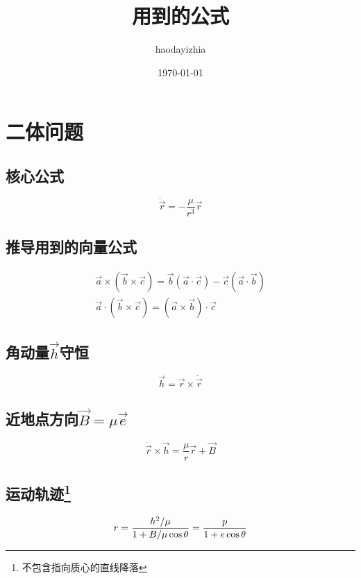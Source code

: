 \documentclass[UTF8]{ctexart}
\title{用到的公式}
\author{haodayizhia}
\date{\today}
\begin{document}
\renewcommand\theequation{%
\thesection.\arabic{equation}}

\maketitle
\tableofcontents
\section{二体问题}

\subsection{核心公式}
\begin{equation}
	\ddot{\vec{r}}=-\frac{\mu}{r^3}\vec{r}
\end{equation}

\subsection{推导用到的向量公式}

\begin{gather}
\vec{a}\times(\vec{b}\times\vec c) =\vec{b}(\vec{a}\cdot\vec{c})-\vec{c}(\vec{a}\cdot\vec{b})\\
\vec{a}\cdot(\vec{b}\times\vec{c})=(\vec{a}\times\vec{b})\cdot\vec{c}
\end{gather}

\subsection{角动量$\vec{h}$守恒}
\begin{equation}
	\vec{h}=\vec{r}\times\dot{\vec{r}}
\end{equation}

\subsection{近地点方向$\vec{B}=\mu\vec{e}$}
\begin{equation}
	\dot{\vec{r}}\times\vec{h}=\frac{\mu}{r}\vec{r}+\vec{B}
\end{equation}

\subsection[运动轨迹]{运动轨迹\footnote{不包含指向质心的直线降落}}
\begin{equation}
	r=\frac{h^2/\mu}{1+B/\mu\cos \theta}=\frac{p}{1+e\cos\theta}\\
\end{equation}
\end{document}
